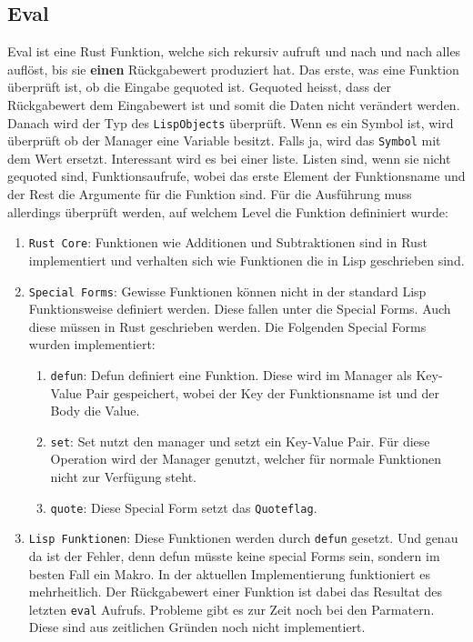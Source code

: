 \documentclass[11pt]{article}
\begin{document}
\subsection{Eval}
\label{sec:orge6a9af2}
\noindent
Eval ist eine Rust Funktion, welche sich rekursiv aufruft und nach und
nach alles auflöst, bis sie \textbf{einen} Rückgabewert produziert hat. Das
erste, was eine Funktion überprüft ist, ob die Eingabe gequoted ist.
Gequoted heisst, dass der Rückgabewert dem Eingabewert ist und somit
die Daten nicht verändert werden. Danach wird der Typ des \texttt{LispObjects}
überprüft. Wenn es ein Symbol ist, wird überprüft ob der Manager eine
Variable besitzt. Falls ja, wird das \texttt{Symbol} mit dem Wert ersetzt.
Interessant wird es bei einer liste. Listen sind, wenn sie nicht
gequoted sind, Funktionsaufrufe, wobei das erste Element der
Funktionsname und der Rest die Argumente für die Funktion sind. Für
die Ausführung muss allerdings überprüft werden, auf welchem Level die
Funktion defininiert wurde:
\begin{enumerate}
\item \texttt{Rust Core}: Funktionen wie Additionen und Subtraktionen sind in Rust
implementiert und verhalten sich wie Funktionen die in Lisp
geschrieben sind.
\item \texttt{Special Forms}: Gewisse Funktionen können nicht in der standard
Lisp Funktionsweise definiert werden. Diese fallen unter die
Special Forms. Auch diese müssen in Rust geschrieben werden. Die
Folgenden Special Forms wurden implementiert:
\begin{enumerate}
\item \texttt{defun}: Defun definiert eine Funktion. Diese wird im Manager als
Key-Value Pair gespeichert, wobei der Key der Funktionsname ist
und der Body die Value.
\item \texttt{set}: Set nutzt den manager und setzt ein Key-Value Pair. Für
diese Operation wird der Manager genutzt, welcher für normale
Funktionen nicht zur Verfügung steht.
\item \texttt{quote}: Diese Special Form setzt das \texttt{Quoteflag}.
\end{enumerate}
\item \texttt{Lisp Funktionen}: Diese Funktionen werden durch \texttt{defun} gesetzt. Und
genau da ist der Fehler, denn defun müsste keine special Forms
sein, sondern im besten Fall ein Makro. In der aktuellen
Implementierung funktioniert es mehrheitlich. Der Rückgabewert
einer Funktion ist dabei das Resultat des letzten \texttt{eval} Aufrufs.
Probleme gibt es zur Zeit noch bei den Parmatern. Diese sind aus
zeitlichen Gründen noch nicht implementiert.
\end{enumerate}
\end{document}
